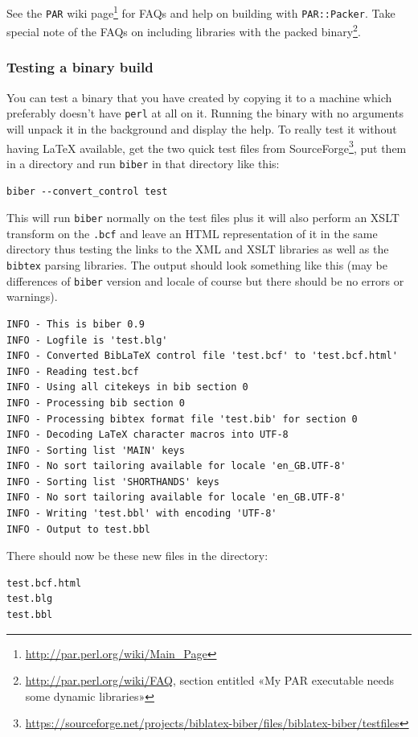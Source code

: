 \documentclass{ltxdockit}
\begin{document}
See the \verb+PAR+ wiki
page\footnote{\url{http://par.perl.org/wiki/Main_Page}} for FAQs and help
on building with \verb+PAR::Packer+. Take special note of the FAQs on
including libraries with the packed
binary\footnote{\url{http://par.perl.org/wiki/FAQ}, section entitled «My
  PAR executable needs some dynamic libraries»}.

\subsubsection{Testing a binary build}
You can test a binary that you have created by copying it to a machine
which preferably doesn't have \verb+perl+ at all on it. Running the binary with no
arguments will unpack it in the background and display the help. To really
test it without having LaTeX available, get the two quick test files from
SourceForge\footnote{\url{https://sourceforge.net/projects/biblatex-biber/files/biblatex-biber/testfiles}},
put them in a directory and run \verb+biber+ in that directory like this:

\begin{verbatim}
biber --convert_control test
\end{verbatim}

\noindent This will run \verb+biber+ normally on the test files plus it
will also perform an XSLT transform on the \verb+.bcf+ and
leave an HTML representation of it in the same directory thus testing the
links to the XML and XSLT libraries as well as the \verb+bibtex+ parsing
libraries. The output should look something like this (may be differences
of \verb+biber+ version and locale of course but there should be no errors
or warnings).

\begin{verbatim}
INFO - This is biber 0.9
INFO - Logfile is 'test.blg'
INFO - Converted BibLaTeX control file 'test.bcf' to 'test.bcf.html'
INFO - Reading test.bcf
INFO - Using all citekeys in bib section 0
INFO - Processing bib section 0
INFO - Processing bibtex format file 'test.bib' for section 0
INFO - Decoding LaTeX character macros into UTF-8
INFO - Sorting list 'MAIN' keys
INFO - No sort tailoring available for locale 'en_GB.UTF-8'
INFO - Sorting list 'SHORTHANDS' keys
INFO - No sort tailoring available for locale 'en_GB.UTF-8'
INFO - Writing 'test.bbl' with encoding 'UTF-8'
INFO - Output to test.bbl
\end{verbatim}

\noindent There should now be these new files in the directory:

\begin{verbatim}
test.bcf.html
test.blg
test.bbl
\end{verbatim}
\end{document}
